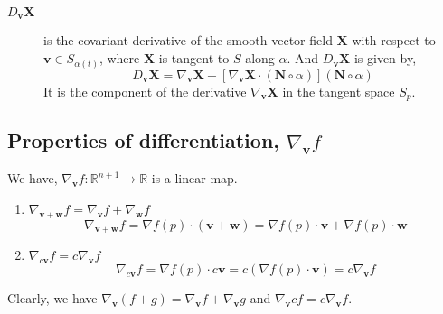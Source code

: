 \begin{description}
\item[$D_{\boldsymbol{v}} \boldsymbol{X}$] is the covariant derivative of the smooth vector field $\boldsymbol{X}$ with respect to $\boldsymbol{v} \in S_{\alpha(t)}$, where $\boldsymbol{X}$ is tangent to $S$ along $\alpha$.
	And $D_{\boldsymbol{v}} \boldsymbol{X}$ is given by,
		\[ D_{\boldsymbol{v}} \boldsymbol{X} = \nabla_{\boldsymbol{v}} \boldsymbol{X} - \left[ \nabla_{\boldsymbol{v}} \boldsymbol{X} \cdot (\boldsymbol{N} \circ \alpha)\right] (\boldsymbol{N} \circ \alpha) \]
	It is the component of the derivative $\nabla_{\boldsymbol{v}} \boldsymbol{X}$ in the tangent space $S_p$.
\end{description}

\subsection{Properties of differentiation, $\nabla_{\boldsymbol{v}} f$}
We have, $\nabla_{\boldsymbol{v}} f : \mathbb{R}^{n+1} \to \mathbb{R}$ is a linear map.
\begin{enumerate}
	\item $\nabla_{\boldsymbol{v}+\boldsymbol{w}} f = \nabla_{\boldsymbol{v}} f + \nabla_{\boldsymbol{w}} f$
		\[ \nabla_{\boldsymbol{v}+\boldsymbol{w}} f = \nabla f(p) \cdot (\boldsymbol{v} + \boldsymbol{w}) = \nabla f(p) \cdot \boldsymbol{v} + \nabla f(p) \cdot \boldsymbol{w} \]
	\item $\nabla_{c\boldsymbol{v}} f = c\nabla_{\boldsymbol{v}} f$
		\[ \nabla_{c\boldsymbol{v}} f = \nabla f(p) \cdot c\boldsymbol{v} = c\left( \nabla f(p) \cdot \boldsymbol{v} \right) = c\nabla_{\boldsymbol{v}} f \]
\end{enumerate}
Clearly, we have $\nabla_{\boldsymbol{v}} (f+g) = \nabla_{\boldsymbol{v}} f + \nabla_{\boldsymbol{v}} g$ and $\nabla_{\boldsymbol{v}} cf = c\nabla_{\boldsymbol{v}} f$.

